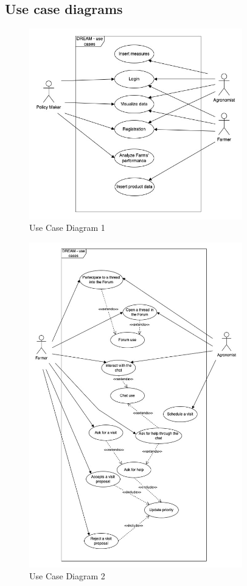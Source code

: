 \documentclass[10pt]{report}
\begin{document}
\subsection{Use case diagrams} 
\begin{figure}[H]
    \centering
    \includegraphics[width=350px]{UseCases diagrams/Use-Case-diagrams-Page-1.jpg}
    \caption{Use Case Diagram 1}
\end{figure}
\begin{figure}[H]
    \centering
    \includegraphics[width=350px]{UseCases diagrams/Use-Case-diagrams-Page-2.jpg}
    \caption{Use Case Diagram 2}
\end{figure}
\end{document}

